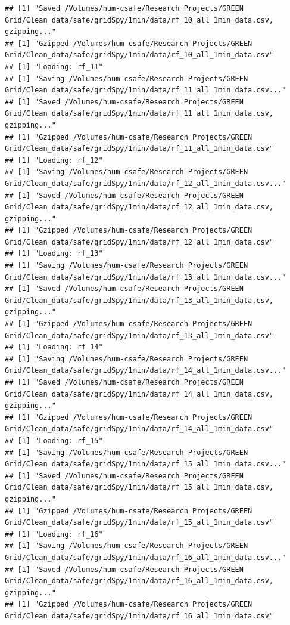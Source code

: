 \documentclass[]{article}
\begin{document}
\begin{verbatim}
## [1] "Saved /Volumes/hum-csafe/Research Projects/GREEN Grid/Clean_data/safe/gridSpy/1min/data/rf_10_all_1min_data.csv, gzipping..."
## [1] "Gzipped /Volumes/hum-csafe/Research Projects/GREEN Grid/Clean_data/safe/gridSpy/1min/data/rf_10_all_1min_data.csv"
## [1] "Loading: rf_11"
## [1] "Saving /Volumes/hum-csafe/Research Projects/GREEN Grid/Clean_data/safe/gridSpy/1min/data/rf_11_all_1min_data.csv..."
## [1] "Saved /Volumes/hum-csafe/Research Projects/GREEN Grid/Clean_data/safe/gridSpy/1min/data/rf_11_all_1min_data.csv, gzipping..."
## [1] "Gzipped /Volumes/hum-csafe/Research Projects/GREEN Grid/Clean_data/safe/gridSpy/1min/data/rf_11_all_1min_data.csv"
## [1] "Loading: rf_12"
## [1] "Saving /Volumes/hum-csafe/Research Projects/GREEN Grid/Clean_data/safe/gridSpy/1min/data/rf_12_all_1min_data.csv..."
## [1] "Saved /Volumes/hum-csafe/Research Projects/GREEN Grid/Clean_data/safe/gridSpy/1min/data/rf_12_all_1min_data.csv, gzipping..."
## [1] "Gzipped /Volumes/hum-csafe/Research Projects/GREEN Grid/Clean_data/safe/gridSpy/1min/data/rf_12_all_1min_data.csv"
## [1] "Loading: rf_13"
## [1] "Saving /Volumes/hum-csafe/Research Projects/GREEN Grid/Clean_data/safe/gridSpy/1min/data/rf_13_all_1min_data.csv..."
## [1] "Saved /Volumes/hum-csafe/Research Projects/GREEN Grid/Clean_data/safe/gridSpy/1min/data/rf_13_all_1min_data.csv, gzipping..."
## [1] "Gzipped /Volumes/hum-csafe/Research Projects/GREEN Grid/Clean_data/safe/gridSpy/1min/data/rf_13_all_1min_data.csv"
## [1] "Loading: rf_14"
## [1] "Saving /Volumes/hum-csafe/Research Projects/GREEN Grid/Clean_data/safe/gridSpy/1min/data/rf_14_all_1min_data.csv..."
## [1] "Saved /Volumes/hum-csafe/Research Projects/GREEN Grid/Clean_data/safe/gridSpy/1min/data/rf_14_all_1min_data.csv, gzipping..."
## [1] "Gzipped /Volumes/hum-csafe/Research Projects/GREEN Grid/Clean_data/safe/gridSpy/1min/data/rf_14_all_1min_data.csv"
## [1] "Loading: rf_15"
## [1] "Saving /Volumes/hum-csafe/Research Projects/GREEN Grid/Clean_data/safe/gridSpy/1min/data/rf_15_all_1min_data.csv..."
## [1] "Saved /Volumes/hum-csafe/Research Projects/GREEN Grid/Clean_data/safe/gridSpy/1min/data/rf_15_all_1min_data.csv, gzipping..."
## [1] "Gzipped /Volumes/hum-csafe/Research Projects/GREEN Grid/Clean_data/safe/gridSpy/1min/data/rf_15_all_1min_data.csv"
## [1] "Loading: rf_16"
## [1] "Saving /Volumes/hum-csafe/Research Projects/GREEN Grid/Clean_data/safe/gridSpy/1min/data/rf_16_all_1min_data.csv..."
## [1] "Saved /Volumes/hum-csafe/Research Projects/GREEN Grid/Clean_data/safe/gridSpy/1min/data/rf_16_all_1min_data.csv, gzipping..."
## [1] "Gzipped /Volumes/hum-csafe/Research Projects/GREEN Grid/Clean_data/safe/gridSpy/1min/data/rf_16_all_1min_data.csv"

\end{verbatim}
\end{document}
